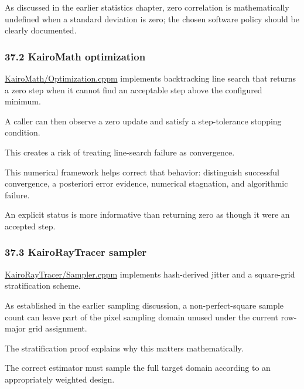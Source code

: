 As discussed in the earlier statistics chapter, zero correlation is mathematically undefined when a standard deviation is zero; the chosen software policy should be clearly documented.

\subsubsection{37.2 KairoMath optimization}\label{02-foundations-ii-ch039-kairomath-optimization}

\hypertarget{02-foundations-ii-ch039-kairomath-optimization}{}

\href{https://github.com/swayam8624/KairoMath/blob/master/Optimization.cppm?utm_source=chatgpt.com}{KairoMath/Optimization.cppm} implements backtracking line search that returns a zero step when it cannot find an acceptable step above the configured minimum.

A caller can then observe a zero update and satisfy a step-tolerance stopping condition.

This creates a risk of treating line-search failure as convergence.

This numerical framework helps correct that behavior: distinguish successful convergence, a posteriori error evidence, numerical stagnation, and algorithmic failure.

An explicit  status is more informative than returning zero as though it were an accepted step.

\subsubsection{37.3 KairoRayTracer sampler}\label{02-foundations-ii-ch039-kairoraytracer-sampler}

\hypertarget{02-foundations-ii-ch039-kairoraytracer-sampler}{}

\href{https://github.com/swayam8624/KairoRayTracer/blob/main/Sampler.cppm?utm_source=chatgpt.com}{KairoRayTracer/Sampler.cppm} implements hash-derived jitter and a square-grid stratification scheme.

As established in the earlier sampling discussion, a non-perfect-square sample count can leave part of the pixel sampling domain unused under the current row-major grid assignment.

The stratification proof explains why this matters mathematically.

The correct estimator must sample the full target domain according to an appropriately weighted design.

